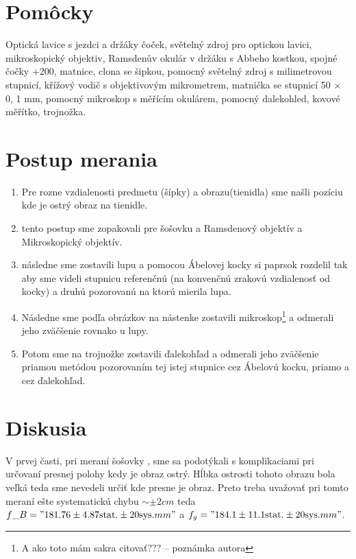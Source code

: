 \documentclass[10pt]{scrartcl}
\begin{document}
\MakeFJFIHead{}






\section{Pomôcky}
Optická lavice s jezdci a držáky čoček, světelný zdroj pro optickou lavici, mikroskopický
objektiv, Ramsdenův okulár v držáku s Abbeho kostkou, spojné čočky +200, matnice,
clona se šipkou, pomocný světelný zdroj s milimetrovou stupnicí, křížový vodič s objektivovým
mikrometrem, matnička se stupnicí 50 × 0, 1 mm, pomocný mikroskop s měřícím okulárem, pomocný
dalekohled, kovové měřítko, trojnožka.

\section{Postup merania}
\begin{enumerate}
\item Pre rozne vzdialenosti predmetu (šípky) a obrazu(tienidla) sme našli pozíciu kde je ostrý obraz na tienidle.
\item tento postup sme zopakovali pre šošovku  a Ramsdenový objektív a Mikroskopický objektív.
\item následne sme zostavili lupu a pomocou Ábelovej kocky si paprsok rozdelil tak aby sme videli stupnicu referenčnú (na konvenčnú zrakovú vzdialenosť od kocky) a druhú pozorovanú na ktorú mierila lupa.
\item Následne sme podľa obrázkov na nástenke zostavili mikroskop\footnote{A ako toto mám sakra citovať??? -- poznámka autora} a odmerali jeho zväčšenie rovnako u lupy.
\item Potom sme na trojnožke zostavili ďalekohľad a odmerali jeho zväčšenie priamou metódou pozorovaním tej istej stupnice cez Ábelovú kocku, priamo a cez ďalekohľad. 
\end{enumerate}


\section{Diskusia}
V prvej časti, pri meraní šošovky , sme sa podotýkali s komplikaciami pri určovaní presnej polohy kedy je obraz ostrý. Hĺbka ostrosti tohoto obrazu bola veľká teda sme nevedeli určiť kde presne je obraz.
Preto treba uvažovať pri tomto meraní ešte systematickú chybu $\sim\pm2cm$ teda $f\_B="181.76\pm4.87\text{stat.}\pm20\text{sys.} mm"$ a $f_g ="184.1\pm11.1\text{stat.}\pm20\text{sys.} mm"$.
\end{document}
